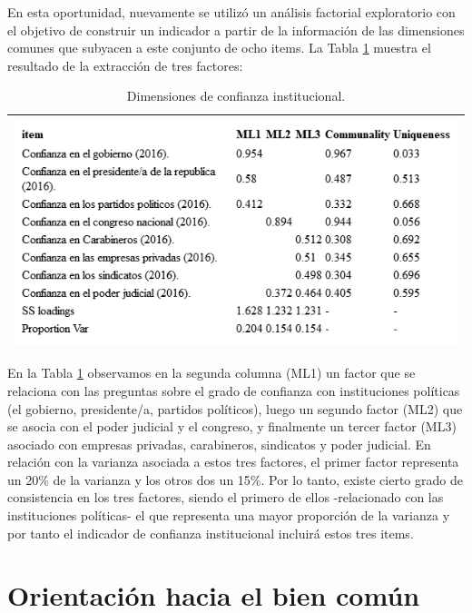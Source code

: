 \documentclass[
  12pt,
]{book}
\begin{document}
En esta oportunidad, nuevamente se utilizó un análisis factorial exploratorio con el objetivo de construir un indicador a partir de la información de las dimensiones comunes que subyacen a este conjunto de ocho items. La Tabla \ref{tab:inst-fa} muestra el resultado de la extracción de tres factores:

\begin{longtable}[]{@{}l@{}}
\caption{\label{tab:inst-fa}Dimensiones de confianza institucional.}\tabularnewline
\toprule
\endhead
\includegraphics[width=8.33333in,height=\textheight]{output/tables/inst_fa.png} \\
\bottomrule
\end{longtable}

En la Tabla \ref{tab:inst-fa} observamos en la segunda columna (ML1) un factor que se relaciona con las preguntas sobre el grado de confianza con instituciones políticas (el gobierno, presidente/a, partidos políticos), luego un segundo factor (ML2) que se asocia con el poder judicial y el congreso, y finalmente un tercer factor (ML3) asociado con empresas privadas, carabineros, sindicatos y poder judicial. En relación con la varianza asociada a estos tres factores, el primer factor representa un 20\% de la varianza y los otros dos un 15\%. Por lo tanto, existe cierto grado de consistencia en los tres factores, siendo el primero de ellos -relacionado con las instituciones políticas- el que representa una mayor proporción de la varianza y por tanto el indicador de confianza institucional incluirá estos tres items.

\hypertarget{orientaciuxf3n-hacia-el-bien-comuxfan}{%
\section{Orientación hacia el bien común}\label{orientaciuxf3n-hacia-el-bien-comuxfan}}
\end{document}
